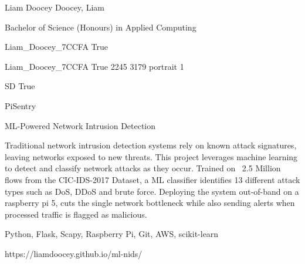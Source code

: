 \documentclass[twoside]{report}
\begin{document}
\begingroup{}\relax



\def\Key{Liam_Doocey_7CCFA}

{Liam Doocey}
{Doocey, Liam}

{Bachelor of Science (Honours) in Applied Computing}

{Liam_Doocey_7CCFA}
{True}

{Liam_Doocey_7CCFA}
{True}
{2245}
{3179}
{portrait}
{1}

{SD}
{True}

{PiSentry}

{ML-Powered Network Intrusion Detection}

{Traditional network intrusion detection systems rely on known attack signatures, leaving networks exposed to new threats. This project leverages machine learning to detect and classify network attacks as they occur. Trained on ~2.5 Million flows from the CIC-IDS-2017 Dataset, a ML classifier identifies 13 different attack types such as DoS, DDoS and brute force. Deploying the system out-of-band on a raspberry pi 5, cuts the single network bottleneck while also sending alerts when processed traffic is flagged as malicious.}

{Python, Flask, Scapy, Raspberry Pi, Git, AWS, scikit-learn}

{https://liamdoocey.github.io/ml-nids/}
\end{document}
